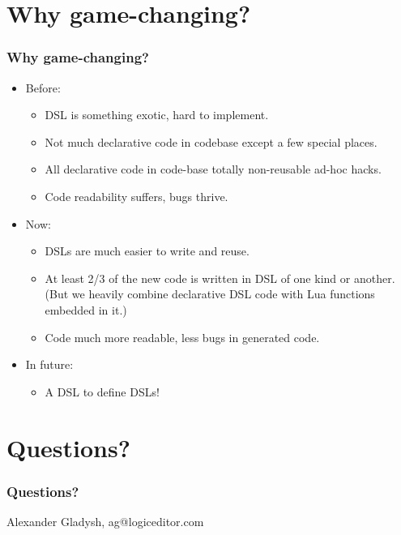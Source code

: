 \documentclass[handout]{beamer}
\begin{document}
\section{Why game-changing?}


\begin{frame}

\frametitle{Why game-changing?}

\begin{itemize}
\item Before:
  \begin{itemize}
  \item DSL is something exotic, hard to implement.
  \item Not much declarative code in codebase except a few special places.
  \item All declarative code in code-base totally non-reusable ad-hoc hacks.
  \item Code readability suffers, bugs thrive.
  \end{itemize}
\pause
\item Now:
  \begin{itemize}
  \item DSLs are much easier to write and reuse.
  \item At least 2/3 of the new code is written in DSL of one kind or another.
        (But we heavily combine declarative DSL code with Lua functions embedded in it.)
  \item Code much more readable, less bugs in generated code.
  \end{itemize}
\item In future:
  \begin{itemize}
  \item A DSL to define DSLs!
  \end{itemize}
\end{itemize}

\end{frame}


\section{Questions?}


\begin{frame}

\frametitle{Questions?}

Alexander Gladysh,
ag@logiceditor.com

\end{frame}


\end{document}
